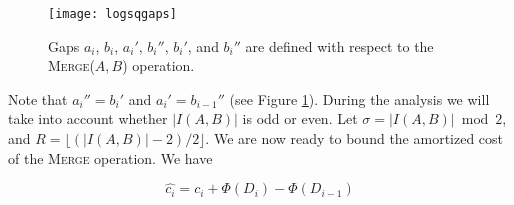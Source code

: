 \documentclass[11pt]{article}
\newcommand{\kwUnion}{Merge}
\newcommand{\Union}{\mbox{\textsc{\kwUnion{}}}}
\newcommand{\Unionx}[2]{\mbox{\textsc{\kwUnion(\ensuremath{#1,#2})}}}
\newcommand{\isodd}{\ensuremath{\sigma}}
\newcommand{\intnum}[2]{\ensuremath{|I(\set{#1},\set{#2})|}}
\newcommand{\set}[1]{\ensuremath{#1}}
\newcommand{\agap}[1]{\ensuremath{a_{#1}}}
\newcommand{\leftofa}[1]{\ensuremath{a_{#1}'}}
\newcommand{\rightofa}[1]{\ensuremath{a_{#1}''}}
\newcommand{\bgap}[1]{\ensuremath{b_{#1}}}
\newcommand{\leftofb}[1]{\ensuremath{b_{#1}'}}
\newcommand{\rightofb}[1]{\ensuremath{b_{#1}''}}
\newcommand{\datast}[1]{\ensuremath{D_{#1}}}
\newcommand{\potfun}[1]{\ensuremath{\Phi(#1)}}
\newcommand{\amcost}[1]{\ensuremath{\hat{c_{#1}}}}
\newcommand{\actcost}[1]{\ensuremath{c_{#1}}}
\newcounter{count}
\begin{document}
 
\begin{figure}
\centering 
\texttt{[image: logsqgaps]} 
\caption{Gaps \agap i, \bgap i, \leftofa i, \rightofb i, \leftofb i, and \rightofb i are defined with respect to the \Unionx{A}{B} operation.} 
\label{fig:lgsqgaps} 
\end{figure} 
 
Note that $\rightofa{ i} = \leftofb{i}$ and $\leftofa{i} = \rightofb{{i-1}}$ (see Figure \ref{fig:lgsqgaps}). During the analysis we will take into account whether \intnum{A}{B} is odd or even. Let $\isodd = \intnum{A}{B} \bmod{2}$, and $R = \lfloor (\intnum{A}{B}-2)/2 \rfloor$. We are now ready to bound the amortized cost of the \Union{} operation. We have 
 
 
\[\amcost i = \actcost i + \potfun{\datast i} - \potfun{\datast{i-1}}\] 
\end{document}
